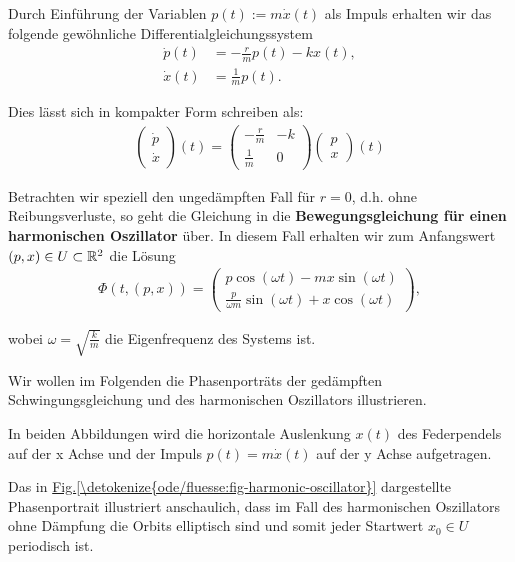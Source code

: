 \begin{example}{}{}
\par
Durch Einführung der Variablen \(p(t):= m\dot{x}(t)\) als Impuls erhalten wir das folgende gewöhnliche Differentialgleichungssystem
\begin{align*}
\dot{p}(t) &= - \frac{r}{m}p(t) -kx(t), \\
\dot{x}(t) &= \frac{1}{m}p(t).
\end{align*}
\par
Dies lässt sich in kompakter Form schreiben als:
\begin{align*}
\begin{pmatrix} \dot{p} \\ \dot{x} \end{pmatrix}(t) = \begin{pmatrix} -\frac{r}{m} & -k \\ \frac{1}{m} & 0\end{pmatrix} \begin{pmatrix}p \\ x\end{pmatrix}(t)
\end{align*}
\par
Betrachten wir speziell den ungedämpften Fall für \(r=0\), d.h. ohne Reibungsverluste, so geht die Gleichung in die \textbf{Bewegungsgleichung für einen harmonischen Oszillator} über.
In diesem Fall erhalten wir zum Anfangswert \((p,x) \in U \subset \mathbb{R}^2 \) die Lösung
\begin{align*}
\Phi(t, (p,x)) = 
\begin{pmatrix}
p \cos(\omega t) - m x \sin(\omega t) \\
\frac{p}{\omega m}\sin(\omega t) + x\cos(\omega t)
\end{pmatrix},
\end{align*}
\par
wobei \(\omega=\sqrt{\frac{k}{m}}\) die Eigenfrequenz des Systems ist.
\end{example}

\par
Wir wollen im Folgenden die Phasenporträts der gedämpften Schwingungsgleichung und des harmonischen Oszillators illustrieren.

\par
In beiden Abbildungen wird die horizontale Auslenkung \(x(t)\) des Federpendels auf der x Achse und der Impuls \(p(t) = m\dot{x}(t)\) auf der y Achse aufgetragen.

\par
Das in \hyperref[\detokenize{ode/fluesse:fig-harmonic-oscillator}]{Fig.\@ \ref{\detokenize{ode/fluesse:fig-harmonic-oscillator}}} dargestellte Phasenportrait illustriert anschaulich, dass im Fall des harmonischen Oszillators ohne Dämpfung die Orbits elliptisch sind und somit jeder Startwert \(x_0 \in U\) periodisch ist.

